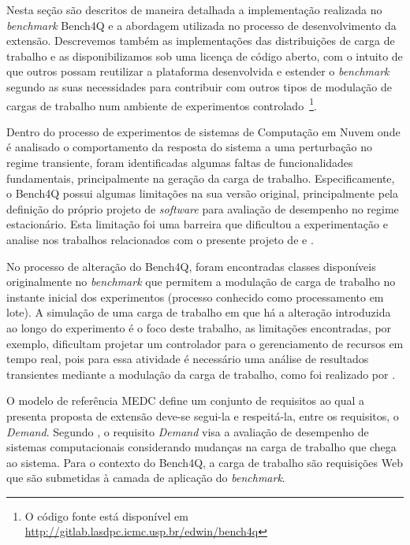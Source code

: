 Nesta seção são descritos de maneira detalhada a implementação realizada no \textit{benchmark} Bench4Q e a abordagem utilizada no processo de desenvolvimento da extensão. Descrevemos também as implementações das distribuições de carga de trabalho e as disponibilizamos sob uma licença de código aberto, com o intuito de que outros possam reutilizar a plataforma desenvolvida e estender o \textit{benchmark} segundo as suas necessidades para contribuir com outros tipos de modulação de cargas de trabalho num ambiente de experimentos controlado~\footnote{O código fonte está disponível em \href{URL}{http://gitlab.lasdpc.icmc.usp.br/edwin/bench4q}}.

Dentro do processo de experimentos de sistemas de Computação em Nuvem onde é analisado o comportamento da resposta do sistema a uma perturbação no regime transiente, foram identificadas algumas faltas de funcionalidades fundamentais, principalmente na geração da carga de trabalho. Especificamente, o Bench4Q possui algumas limitações na sua versão original, principalmente pela definição do próprio projeto de \textit{software} para avaliação de desempenho no regime estacionário. Esta limitação foi uma barreira que dificultou a experimentação e analise nos trabalhos relacionados com o presente projeto de  e .

No processo de alteração do Bench4Q, foram encontradas classes disponíveis originalmente no \textit{benchmark} que permitem a modulação de carga de trabalho no instante inicial dos experimentos (processo conhecido como processamento em lote). A simulação de uma carga de trabalho em que há a alteração introduzida ao longo do experimento é o foco deste trabalho, as limitações encontradas, por exemplo, dificultam projetar um controlador para o gerenciamento de recursos em tempo real, pois para essa atividade é necessário uma análise de resultados transientes mediante a modulação da carga de trabalho, como foi realizado por . 

O modelo de referência MEDC define um conjunto de requisitos ao qual a presenta proposta de extensão deve-se segui-la e respeitá-la, entre os requisitos, o \textit{Demand}. Segundo , o requisito \textit{Demand} visa a avaliação de desempenho de sistemas computacionais considerando mudanças na carga de trabalho que chega ao sistema. Para o contexto do Bench4Q, a carga de trabalho são requisições Web que são submetidas à camada de aplicação do \textit{benchmark}. 

